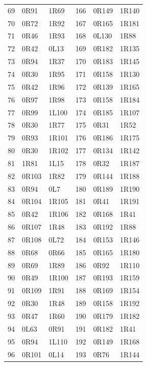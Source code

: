 \begin{longtable}{rll@{\hspace{1.2cm}}rll}
69&0R91&1R69&166&0R149&1R140\\
70&0R72&1R92&167&0R165&1R181\\
71&0R46&1R93&168&0L130&1R88\\
72&0R42&0L13&169&0R182&1R135\\
73&0R94&1R37&170&0R183&1R145\\
74&0R30&1R95&171&0R158&1R130\\
75&0R42&1R96&172&0R139&1R165\\
76&0R97&1R98&173&0R158&1R184\\
77&0R99&1L100&174&0R185&1R107\\
78&0R30&1R77&175&0R31&1R52\\
79&0R93&1R101&176&0R186&1R175\\
80&0R30&1R102&177&0R134&1R142\\
81&1R81&1L15&178&0R32&1R187\\
82&0R103&1R82&179&0R144&1R188\\
83&0R94&0L7&180&0R189&1R190\\
84&0R104&1R105&181&0R41&1R191\\
85&0R42&1R106&182&0R168&1R41\\
86&0R107&1R48&183&0R192&1R88\\
87&0R108&0L72&184&0R153&1R146\\
88&0R68&0R66&185&0R165&1R180\\
89&0R69&1R89&186&0R92&1R110\\
90&0R49&1R100&187&0R193&1R159\\
91&0R109&1R91&188&0R169&1R154\\
92&0R30&1R48&189&0R158&1R192\\
93&0R47&1R60&190&0R179&1R182\\
94&0L63&0R91&191&0R182&1R41\\
95&0R94&1L110&192&0R149&1R168\\
96&0R101&0L14&193&0R76&1R144\\
\end{longtable}
\endgroup
